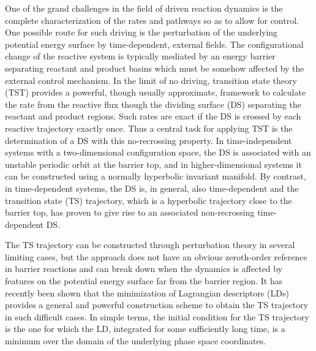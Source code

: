 \documentclass[aip,reprint,jcp,amsmath,amssymb,superscriptaddress,floatfix]{revtex4-1}
\begin{document}
One of the grand challenges in the field of driven reaction dynamics 
is the complete characterization of the rates and pathways so as
to allow for control.
One possible route for such driving is the perturbation of the underlying 
potential energy surface by time-dependent, external fields.
\cite{Yamanouchi2002,hern05a,Sussman2006,Kawai07,Kawai11laser,Keshavamurthy2009,
Keshavamurthy2015,Revuelta2015}
The configurational change of the reactive system is typically 
mediated by an energy barrier 
separating reactant and product basins which must be somehow
affected by the external control mechanism.
In the limit of no driving,
transition state theory (TST)
\cite{pitzer,pechukas1981,truh79,truh85,truhlar91,truh96,truh2000,
Komatsuzaki2001,Waalkens2008,hern08d,Komatsuzaki2010,hern10a,Henkelman2016} 
provides a powerful, though usually approximate, 
framework to calculate the rate
from the reactive 
flux though the dividing surface (DS) separating the reactant and 
product regions.
Such rates are exact if the DS is crossed by each 
reactive trajectory exactly once.
Thus a central task for applying TST is 
the determination of a DS with this no-recrossing property.
In time-independent systems with a two-dimensional configuration space, the DS 
is associated with an unstable periodic orbit at the barrier top, and in 
higher-dimensional systems it can be constructed using a normally hyperbolic 
invariant manifold.
\cite{pollak78,pech79a,hern93b,hern94,Jaffe00,Koon00,Jaffe02,Uzer02,Waalkens04b,Jaffe05,
Li06prl,Teramoto11,Waalkens13}
By contrast, in time-dependent systems, the DS is, in general, also 
time-dependent and the transition state (TS) trajectory,
\cite{dawn05b,dawn05a,hern06d,hern14b,hern14f,hern15a,Kawai2009a} 
which is a hyperbolic trajectory close to the barrier top, 
has proven to give rise to an associated 
non-recrossing time-dependent DS.

The TS trajectory can be constructed through perturbation theory
in several limiting cases,\cite{hern93b,dawn05a}
but the approach does not have an obvious zeroth-order reference in
barrier reactions\cite{hern16a}
and can break down when the dynamics is affected by features on the
potential energy surface far from the barrier region.
It has recently been shown that the minimization of Lagrangian descriptors 
\cite{Mancho2010,Mancho2013} 
(LDs) provides a general and powerful construction scheme to obtain the TS 
trajectory in such difficult cases.\cite{hern15a,hern15e,hern16a,hern16d} 
In simple terms, the initial condition for the TS trajectory
is the one for which the LD,
integrated for some sufficiently long time,
is a minimum over the
domain of the underlying phase space coordinates. 
\end{document}
